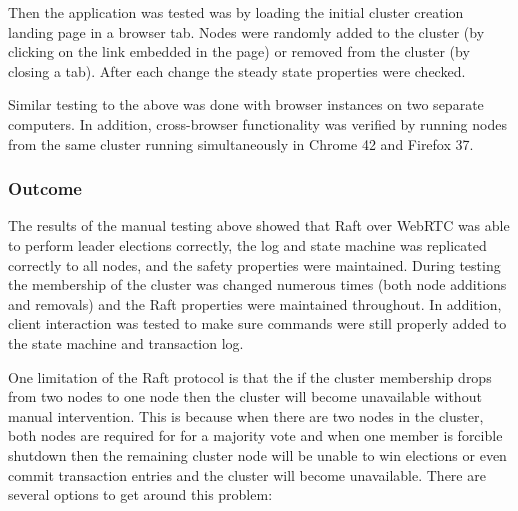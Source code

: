 \documentclass[9pt]{extarticle}
\begin{document}
\begin{multicols}{2}
Then the application was tested was by loading the initial cluster
creation landing page in a browser tab. Nodes were randomly added to
the cluster (by clicking on the link embedded in the page) or removed
from the cluster (by closing a tab). After each change the steady
state properties were checked.

Similar testing to the above was done with browser instances on two
separate computers. In addition, cross-browser functionality was
verified by running nodes from the same cluster running simultaneously
in Chrome 42 and Firefox 37.


\subsubsection{Outcome}

The results of the manual testing above showed that Raft over WebRTC
was able to perform leader elections correctly, the log and state
machine was replicated correctly to all nodes, and the safety
properties were maintained. During testing the membership of the
cluster was changed numerous times (both node additions and removals)
and the Raft properties were maintained throughout. In addition,
client interaction was tested to make sure commands were still
properly added to the state machine and transaction log.

One limitation of the Raft protocol is that the if the cluster
membership drops from two nodes to one node then the cluster will
become unavailable without manual intervention. This is because when
there are two nodes in the cluster, both nodes are required for for
a majority vote and when one member is forcible shutdown then the
remaining cluster node will be unable to win elections or even commit
transaction entries and the cluster will become unavailable. There are
several options to get around this problem:



\end{multicols}
\end{document}
